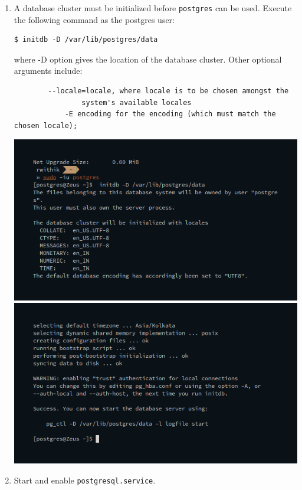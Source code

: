 \documentclass[10pt,a4paper,titlepage]{report}
\begin{document}
{\begin{enumerate}
	\item A database cluster must be initialized before \texttt{postgres} can be used. Execute the following command as the postgres user:
	\begin{verbatim}
$ initdb -D /var/lib/postgres/data
	\end{verbatim}
	where -D option gives the location of the database cluster.
	Other optional arguments include:
		\begin{verbatim}
	    --locale=locale, where locale is to be chosen amongst the 
				system's available locales
		    -E encoding for the encoding (which must match the chosen locale);
		\end{verbatim}
		\includegraphics[width=\linewidth]{../Images/Installation/3.png}\newline
		\includegraphics[width=\linewidth]{../Images/Installation/4.png}\newline
	\item Start and enable \verb-postgresql.service-. 
		\begin{verbatim}

\end{verbatim}
\end{enumerate}}
\end{document}
